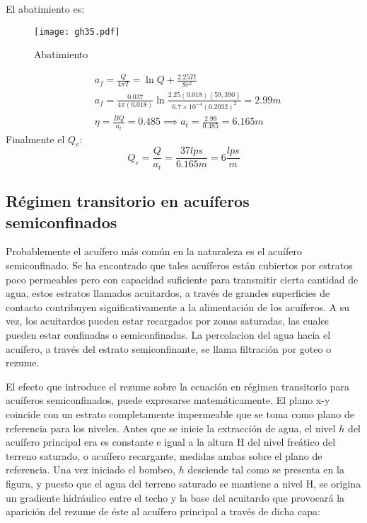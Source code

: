 \begin{example}
El abatimiento es:
\begin{figure}[h!]
\centering
  \texttt{[image: gh35.pdf]}
  \caption{Abatimiento}
  \label{gh35}
\end{figure}
\begin{align*}
    &a_f = \frac{Q}{4\pi T} = \ln{Q} + \frac{2.25Tt}{Sr^2}\\
    &a_f = \frac{0.037}{4\pi (0.018)} \ln{\frac{2.25(0.018)(59,390)}{6.7 \times 10^{ - 4}(0.2032)^2}} = 2.99m\\
    &\eta = \frac{BQ}{a_t} = 0.485\implies a_t = \frac{2.99}{0.485} = 6.165m
\end{align*}
Finalmente el $Q_e$:
\begin{equation*}
    Q_e = \frac{Q}{a_t} = \frac{37 lps}{6.165m} = 6\frac{lps}{m}
\end{equation*}
\end{example}

\subsection{Régimen transitorio en acuíferos semiconfinados}
Probablemente el acuífero más común en la naturaleza es el acuífero semiconfinado. Se ha encontrado que tales acuíferos están cubiertos por estratos poco permeables pero con capacidad suficiente para transmitir cierta cantidad de agua, estos estratos llamados acuitardos, a través de grandes superficies de contacto contribuyen significativamente a la alimentación de los acuíferos. A su vez, los acuitardos pueden estar recargados por zonas saturadas, las cuales pueden estar confinadas o semiconfinadas. La percolacion del agua hacia el acuífero, a través del estrato semiconfinante, se llama filtración por goteo o rezume.

El efecto que introduce el rezume sobre la ecuación en régimen transitorio para acuíferos semiconfinados, puede expresarse matemáticamente. El plano x-y coincide con un estrato completamente impermeable que se toma como plano de referencia para los niveles. Antes que se inicie la extracción de agua, el nivel $h$ del acuífero principal era es constante e igual a la altura H del nivel freático del terreno saturado, o acuífero recargante, medidas ambas sobre el plano de referencia. Una vez iniciado el bombeo, $h$ desciende tal como se presenta en la figura, y puesto que el agua del terreno saturado se mantiene a nivel H, se origina un gradiente hidráulico entre el techo y la base del acuitardo que provocará la aparición del rezume de éste al acuífero principal a través de dicha capa:

